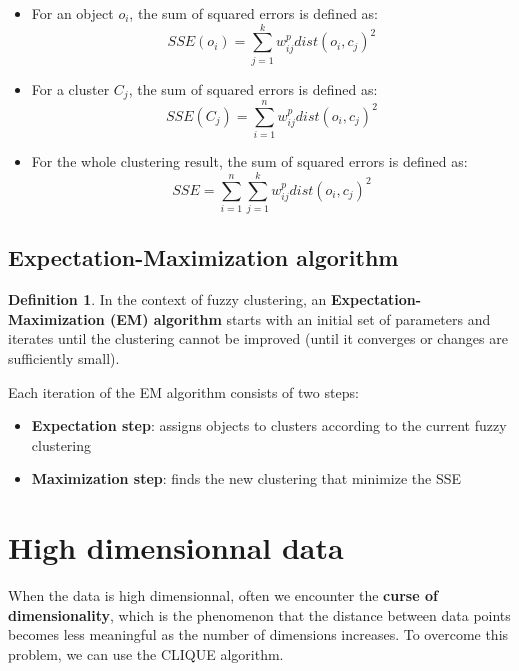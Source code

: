 \documentclass[12pt, openany]{report}
\theoremstyle{definition}
\newtheorem{definition}[thm]{Definition}
\begin{document}
\begin{itemize}
    \item For an object $o_i$, the sum of squared errors is defined as:
    \begin{equation}
        SSE(o_i) = \sum_{j=1}^{k} w_{ij}^p dist(o_i,c_j)^2
    \end{equation}
    \item For a cluster $C_j$, the sum of squared errors is defined as:
    \begin{equation}        
        SSE(C_j) = \sum_{i=1}^{n} w_{ij}^p dist(o_i,c_j)^2
    \end{equation}
    \item For the whole clustering result, the sum of squared errors is defined as:
    \begin{equation}
        SSE = \sum_{i=1}^{n} \sum_{j=1}^{k} w_{ij}^p dist(o_i,c_j)^2
    \end{equation}
\end{itemize}
\subsection{Expectation-Maximization algorithm}
\begin{definition}
    In the context of fuzzy clustering, an \textbf{Expectation-Maximization (EM) algorithm} starts with an initial set of parameters and iterates until the clustering cannot be improved (until it converges or changes are sufficiently small).
\end{definition}
Each iteration of the EM algorithm consists of two steps:
\begin{itemize}
    \item \textbf{Expectation step}: assigns objects to clusters according to the current fuzzy clustering
    \item \textbf{Maximization step}: finds the new clustering that minimize the SSE
\end{itemize}
\section{High dimensionnal data}
When the data is high dimensionnal, often we encounter the \textbf{curse of dimensionality}, which is the phenomenon that the distance between data points becomes less meaningful as the number of dimensions increases. To overcome this problem, we can use the CLIQUE algorithm.
\end{document}
